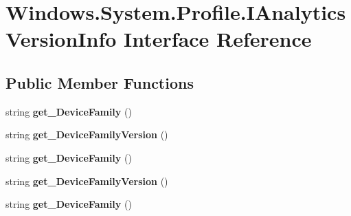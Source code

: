 \hypertarget{interface_windows_1_1_system_1_1_profile_1_1_i_analytics_version_info}{}\section{Windows.\+System.\+Profile.\+I\+Analytics\+Version\+Info Interface Reference}
\label{interface_windows_1_1_system_1_1_profile_1_1_i_analytics_version_info}
\subsection*{Public Member Functions}
\begin{DoxyCompactItemize}
\item 
\mbox{\label{interface_windows_1_1_system_1_1_profile_1_1_i_analytics_version_info_a123981ecd7ac09b4fa3f11b37ec6f741}} 
string {\bfseries get\+\_\+\+Device\+Family} ()
\item 
\mbox{\label{interface_windows_1_1_system_1_1_profile_1_1_i_analytics_version_info_a5a1fbf289b9852814166002dcee9a749}} 
string {\bfseries get\+\_\+\+Device\+Family\+Version} ()
\item 
\mbox{\label{interface_windows_1_1_system_1_1_profile_1_1_i_analytics_version_info_a123981ecd7ac09b4fa3f11b37ec6f741}} 
string {\bfseries get\+\_\+\+Device\+Family} ()
\item 
\mbox{\label{interface_windows_1_1_system_1_1_profile_1_1_i_analytics_version_info_a5a1fbf289b9852814166002dcee9a749}} 
string {\bfseries get\+\_\+\+Device\+Family\+Version} ()
\item 
\mbox{\label{interface_windows_1_1_system_1_1_profile_1_1_i_analytics_version_info_a123981ecd7ac09b4fa3f11b37ec6f741}} 
string {\bfseries get\+\_\+\+Device\+Family} ()
\item 
\mbox{\label{interface_windows_1_1_system_1_1_profile_1_1_i_analytics_version_info_a5a1fbf289b9852814166002dcee9a749}} 

\end{DoxyCompactItemize}
